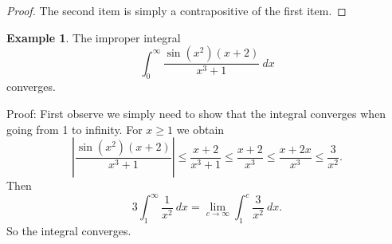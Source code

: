 \documentclass[12pt]{book}
\newcommand{\abs}[1]{\left\lvert {#1} \right\rvert}
\newcommand{\R}{{\mathbb{R}}}
\newcommand{\N}{{\mathbb{N}}}
\theoremstyle{plain}
\theoremstyle{remark}
\theoremstyle{definition}
\theoremstyle{exercise}
\theoremstyle{example}
\newtheorem{example}[thm]{Example}
\begin{document}
\begin{proof}
The second item is simply a contrapositive of the first item.
\end{proof}

\begin{example}
The improper integral
\begin{equation*}
\int_0^\infty \frac{\sin(x^2)(x+2)}{x^3+1} ~dx
\end{equation*}
converges.

Proof:  First observe we simply need to show
that the integral converges when going from 1 to infinity.
For $x \geq 1$ we obtain
\begin{equation*}
\abs{\frac{\sin(x^2)(x+2)}{x^3+1}}
\leq
\frac{x+2}{x^3+1}
\leq \frac{x+2}{x^3} \leq
\frac{x+2x}{x^3} \leq \frac{3}{x^2} .
\end{equation*}
Then
\begin{equation*}
3 \int_1^\infty \frac{1}{x^2}~dx
=
\lim_{c\to\infty} \int_1^c \frac{3}{x^2} ~dx.
\end{equation*}
So the integral converges.
\end{example}
\end{document}

